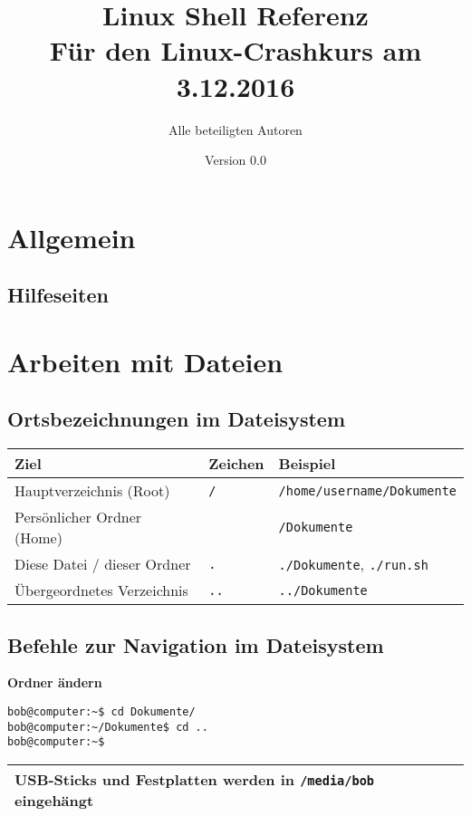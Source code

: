 \documentclass[11pt]{article}
\title{\textbf{Linux Shell Referenz}\\Für den Linux-Crashkurs am 3.12.2016}
\author{Alle beteiligten Autoren}
\date{Version 0.0}
\newcommand{\textapprox}{\raisebox{0.5ex}{\texttildelow}}
\begin{document}
\maketitle

\section {Allgemein}

\subsection {Hilfeseiten}

\section {Arbeiten mit Dateien}

\subsection {Ortsbezeichnungen im Dateisystem}

\begin{tabularx}{1\textwidth}{|l|l|X|}
\hline
\textbf{Ziel} & \textbf{Zeichen} & \textbf{Beispiel} \\
\hline
Hauptverzeichnis (Root) & \lstinline$/$ & \lstinline$/home/username/Dokumente$ \\
Persönlicher Ordner (Home) & \textapprox & \textapprox\lstinline$/Dokumente$ \\
Diese Datei / dieser Ordner & \lstinline$.$ & \lstinline$./Dokumente$, \lstinline$./run.sh$ \\
Übergeordnetes Verzeichnis & \lstinline$..$ & \lstinline$../Dokumente$ \\
\hline
\end{tabularx}

\subsection {Befehle zur Navigation im Dateisystem}

\textbf{Ordner ändern}
\begin{multicols}{2}
\begin{lstlisting}[style=terminal]
bob@computer:~$ cd Dokumente/
bob@computer:~/Dokumente$ cd ..
bob@computer:~$
\end{lstlisting}
\columnbreak
\begin{tabularx}{1\columnwidth}{||X||}
\hline
\textbf USB-Sticks und Festplatten werden in \lstinline$/media/bob$ eingehängt\\
\hline
\end{tabularx}
\end{multicols}
\end{document}
